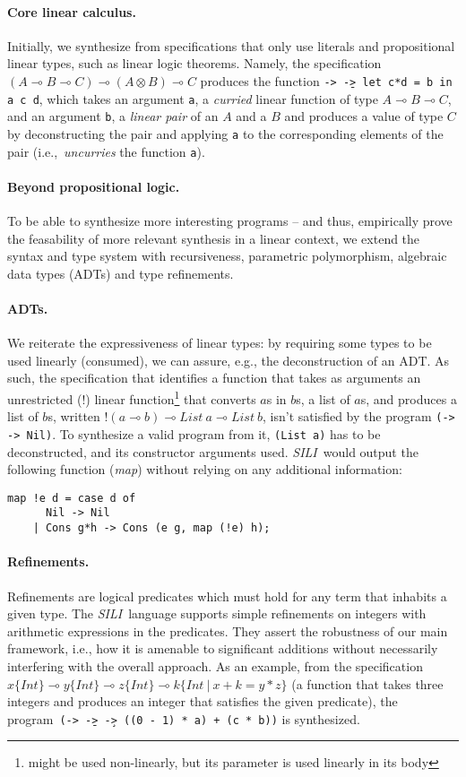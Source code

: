 \documentclass{llncs}
\newcommand{\lolli}{\multimap}
\newcommand{\tensor}{\otimes}
\newcommand{\bang}{{!}}
\newcommand{\mypara}[1]{\paragraph{\textbf{#1}.}}
\newcommand{\synname}{\emph{SILI}}
\begin{document}
\mypara{Core linear calculus} Initially, we synthesize from
specifications that only use literals and propositional linear types, such as linear logic theorems. Namely,
the specification $(A \lolli B \lolli C) \lolli (A \tensor B) \lolli C$ produces
the function \texttt{\a -> \b -> let c*d = b in a c d},
which takes an argument \texttt{a}, a
\emph{curried} linear function of type $A \lolli B \lolli C$,  and an
argument \texttt{b}, a \emph{linear
  pair} of an $A$ and a $B$ and produces a value of type $C$ by
deconstructing the pair and applying \texttt{a} to the
corresponding elements of the pair (i.e.,~\emph{uncurries} the
function \texttt{a}).


\mypara{Beyond propositional logic} To be able to synthesize more
interesting programs -- and thus, empirically prove the feasability of
more relevant synthesis in a linear context, we extend the syntax and
type system with recursiveness, parametric polymorphism, algebraic
data types (ADTs) and type refinements.


\mypara{ADTs} We reiterate the expressiveness of linear types: by requiring
some types to be used linearly (consumed), we can assure, e.g., the
deconstruction of an ADT. As such, the specification that identifies a function
that takes as arguments an unrestricted ($\bang$) linear function\footnote{might be used non-linearly, but its parameter is used
linearly in its body} 
that converts $a$s in $b$s, a list of $a$s, and produces a
list of $b$s, written $\bang(a \lolli b) \lolli List\ a \lolli List\ b$, isn't
satisfied by the program \texttt{(\x -> \y -> Nil)}. To synthesize
a valid program from it, \texttt{(List a)} has to be deconstructed,
and its constructor arguments used. \synname\ would output the following
function (\emph{map}) without relying on any additional information:
%
%
\begin{verbatim}
map !e d = case d of
      Nil -> Nil
    | Cons g*h -> Cons (e g, map (!e) h);
\end{verbatim}

\mypara{Refinements} Refinements are logical predicates
which must hold for any term that inhabits a given type. The \synname\
language supports simple refinements on integers with arithmetic
expressions in the predicates. They assert the robustness of our main
framework, i.e., how it is amenable to significant additions without
necessarily interfering with the overall approach.
%
As an example, from the specification $x \{Int\} \lolli y \{Int\} \lolli z
\{Int\} \lolli k \{Int\ \vert\ x + k = y * z\}$ (a function that takes three
integers and produces an integer that satisfies the given predicate), the
program\ \texttt{(\a -> \b -> \c -> ((0 - 1) * a) + (c * b))} is
synthesized.
\end{document}
